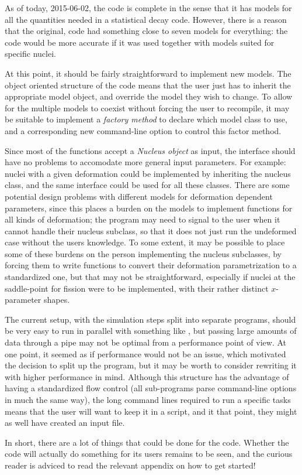 As of today, 2015-06-02, the \codename{} code is complete in the sense that it has models for all the quantities needed in a statistical decay code.
However, there is a reason that the original,  code had something close to seven models for everything: the code would be more accurate if it was used together with models suited for specific nuclei.

At this point, it should be fairly straightforward to implement new models. The object oriented structure of the code means that the user just has to inherit the appropriate model object, and override the model they wish to change. To allow for the multiple models to coexist without forcing the user to recompile, it may be suitable to implement a \emph{factory method} to declare which model class to use, and a corresponding new command-line option to control this factor method.

Since most of the functions accept a \emph{Nucleus object} as input, the interface should have no problems to accomodate more general input parameters. For example: nuclei with a given deformation could be implemented by inheriting the nucleus class, and the same interface could be used for all these classes. 
There are some potential design problems with different models for deformation dependent parameters, since this places a burden on the models to implement functions for all kinds of deformation; the program may need to signal to the user when it cannot handle their nucleus subclass, so that it does not just run the undeformed case without the users knowledge. To some extent, it may be possible to place some of these burdens on the person implementing the nucleus subclasses, by forcing them to write functions to convert their deformation parametrization to a standardized one, but that may not be straightforward, especially if nuclei at the saddle-point for fission were to be implemented, with their rather distinct $x$-parameter shapes.

The current setup, with the simulation steps split into separate programs, should be very easy to run in parallel with something like , but passing large amounts of data through a pipe may not be optimal from a performance point of view. At one point, it seemed as if performance would not be an issue, which motivated the decision to split up the program, but it may be worth to consider rewriting it with higher performance in mind. Although this structure has the advantage of having a standardized flow control (all sub-programs parse command-line options in much the same way), the long command lines required to run a specific tasks means that the user will want to keep it in a script, and it that point, they might as well have created an input file. 

In short, there are a lot of things that could be done for the code. 
Whether the code will actually do something for its users remains to be seen, and the curious reader is adviced to read the relevant appendix on how to get started!
